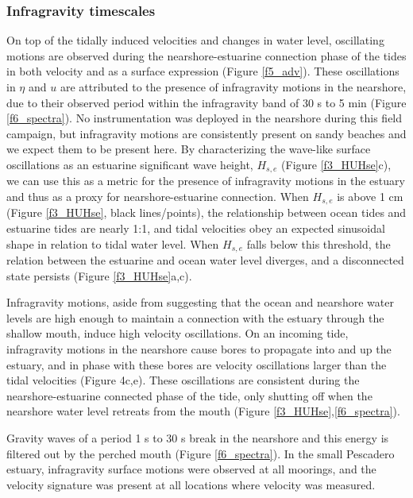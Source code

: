 \subsubsection{Infragravity timescales}

On top of the tidally induced velocities and changes in water level,
oscillating motions are observed during the nearshore-estuarine connection
phase of the tides in both velocity and as a surface expression (Figure
\ref{f5_adv}). These oscillations in $\eta$ and $u$ are attributed
to the presence of infragravity motions in the nearshore, due to their
observed period within the infragravity band of 30 s to 5 min (Figure
\ref{f6_spectra}). No instrumentation was deployed in the nearshore
during this field campaign, but infragravity motions are consistently
present on sandy beaches \citep{contardo_and_symonds} and we expect
them to be present here. By characterizing the wave-like surface oscillations
as an estuarine significant wave height, $H_{s,e}$ (Figure \ref{f3_HUHse}c),
we can use this as a metric for the presence of infragravity motions
in the estuary and thus as a proxy for nearshore-estuarine connection.
When $H_{s,e}$ is above 1 cm (Figure \ref{f3_HUHse}, black lines/points),
the relationship between ocean tides and estuarine tides are nearly
1:1, and tidal velocities obey an expected sinusoidal shape in relation
to tidal water level. When $H_{s,e}$ falls below this threshold,
the relation between the estuarine and ocean water level diverges,
and a disconnected state persists (Figure \ref{f3_HUHse}a,c).

Infragravity motions, aside from suggesting that the ocean and nearshore
water levels are high enough to maintain a connection with the estuary
through the shallow mouth, induce high velocity oscillations. On an
incoming tide, infragravity motions in the nearshore cause bores to
propagate into and up the estuary, and in phase with these bores are
velocity oscillations larger than the tidal velocities (Figure 4c,e).
These oscillations are consistent during the nearshore-estuarine connected
phase of the tide, only shutting off when the nearshore water level
retreats from the mouth (Figure \ref{f3_HUHse},\ref{f6_spectra}). 

Gravity waves of a period 1 s to 30 s break in the nearshore and this
energy is filtered out by the perched mouth (Figure \ref{f6_spectra}).
In the small Pescadero estuary, infragravity surface motions were
observed at all moorings, and the velocity signature was present at
all locations where velocity was measured.


